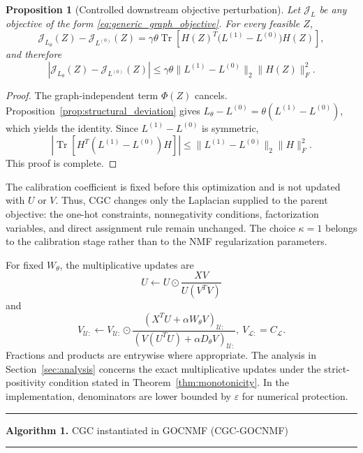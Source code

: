 \documentclass[11pt]{article}
\newtheorem{proposition}{Proposition}
\theoremstyle{remark}
\newcommand{\Tr}{\operatorname{Tr}}
\newcommand{\eps}{\varepsilon}
\newcommand{\had}{\odot}
\begin{document}
\begin{proposition}[Controlled downstream objective perturbation]
\label{prop:objective_deviation}
Let $\mathcal J_L$ be any objective of the form \eqref{eq:generic_graph_objective}. For every feasible $Z$,
\[
\mathcal J_{L_\theta}(Z)-\mathcal J_{L^{(0)}}(Z)
=
\gamma\theta\Tr\!\left[
H(Z)^T\bigl(L^{(1)}-L^{(0)}\bigr)H(Z)
\right],
\]
and therefore
\[
\left|
\mathcal J_{L_\theta}(Z)-\mathcal J_{L^{(0)}}(Z)
\right|
\le
\gamma\theta
\|L^{(1)}-L^{(0)}\|_2
\|H(Z)\|_F^2.
\]
\end{proposition}

\begin{proof}
The graph-independent term $\Phi(Z)$ cancels. Proposition~\ref{prop:structural_deviation} gives $L_\theta-L^{(0)}=\theta(L^{(1)}-L^{(0)})$, which yields the identity. Since $L^{(1)}-L^{(0)}$ is symmetric,
\[
\left|
\Tr\!\left[
H^T(L^{(1)}-L^{(0)})H
\right]
\right|
\le
\|L^{(1)}-L^{(0)}\|_2\|H\|_F^2.
\]
This proof is complete.
\end{proof}

The calibration coefficient is fixed before this optimization and is not updated with $U$ or $V$. Thus, CGC changes only the Laplacian supplied to the parent objective: the one-hot constraints, nonnegativity conditions, factorization variables, and direct assignment rule remain unchanged. The choice $\kappa=1$ belongs to the calibration stage rather than to the NMF regularization parameters.

For fixed $W_{\theta}$, the multiplicative updates are
\begin{equation}
\label{eq:update_u}
U\leftarrow U\had\frac{XV}{U(V^{T}V)}
\end{equation}
and
\begin{equation}
\label{eq:update_v}
V_{\mathcal U:}\leftarrow V_{\mathcal U:}\had
\frac{(X^{T}U+\alpha W_{\theta}V)_{\mathcal U:}}
{(V(U^{T}U)+\alpha D_{\theta}V)_{\mathcal U:}},
~
V_{\mathcal L:}=C_{\mathcal L}.
\end{equation}
Fractions and products are entrywise where appropriate. The analysis in Section~\ref{sec:analysis} concerns the exact
multiplicative updates under the strict-positivity condition stated in
Theorem~\ref{thm:monotonicity}. In the implementation, denominators are lower bounded by
\(\eps\) for numerical protection.

\medskip
\noindent\rule{\linewidth}{0.4pt}
\noindent\textbf{Algorithm 1.} CGC instantiated in GOCNMF (CGC-GOCNMF)
\par\noindent\rule{\linewidth}{0.4pt}
\end{document}
